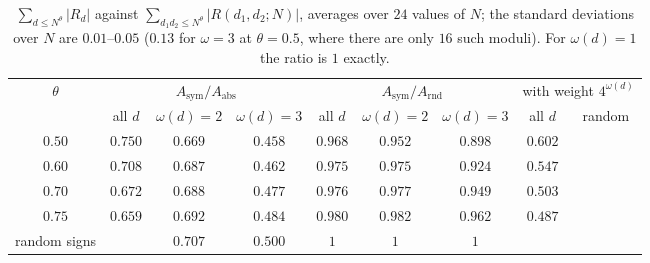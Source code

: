 \documentclass[11pt,a4paper]{article}
\theoremstyle{remark}
\theoremstyle{definition}
\begin{document}
\begin{table}[h]
\centering\small
\begin{tabular}{c|ccc|ccc|cc}
\toprule
$\theta$ & \multicolumn{3}{c|}{$A_{\mathrm{sym}}/A_{\mathrm{abs}}$} & \multicolumn{3}{c|}{$A_{\mathrm{sym}}/A_{\mathrm{rnd}}$} & \multicolumn{2}{c}{with weight $4^{\omega(d)}$}\\
 & all $d$ & $\omega(d)=2$ & $\omega(d)=3$ & all $d$ & $\omega(d)=2$ & $\omega(d)=3$ & all $d$ & random\\
\midrule
$0.50$ & $0.750$ & $0.669$ & $0.458$ & $0.968$ & $0.952$ & $0.898$ & $0.602$ & \\
$0.60$ & $0.708$ & $0.687$ & $0.462$ & $0.975$ & $0.975$ & $0.924$ & $0.547$ & \\
$0.70$ & $0.672$ & $0.688$ & $0.477$ & $0.976$ & $0.977$ & $0.949$ & $0.503$ & \\
$0.75$ & $0.659$ & $0.692$ & $0.484$ & $0.980$ & $0.982$ & $0.962$ & $0.487$ & \\
\midrule
random signs & & $0.707$ & $0.500$ & $1$ & $1$ & $1$ & & \\
\bottomrule
\end{tabular}
\caption{$\sum_{d\le N^\theta}|R_d|$ against $\sum_{d_1d_2\le N^\theta}|R(d_1,d_2;N)|$, averages over $24$ values of $N$; the standard deviations over $N$ are $0.01$--$0.05$ ($0.13$ for $\omega=3$ at $\theta=0.5$, where there are only $16$ such moduli). For $\omega(d)=1$ the ratio is $1$ exactly.}
\label{tab:ratios}
\end{table}
\end{document}
